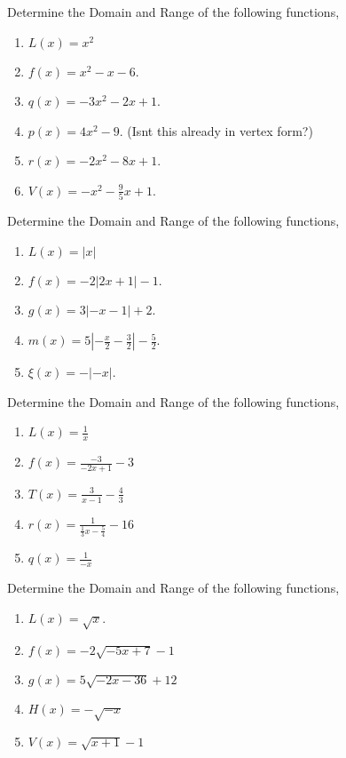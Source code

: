 \documentclass[12pt]{article} %
\begin{document}
\begin{qstn}
  Determine the Domain and Range of the following functions,
  \begin{enumerate}[label=(\alph*)]
    \item $L(x) = x^2$
    \item $f(x) = x^2 - x - 6$.
    \item $q(x) = -3x^2 - 2x + 1$.
    \item $p(x) = 4x^2 - 9$. (Isnt this already in vertex form?)
    \item $r(x) = -2x^2 - 8x + 1$.
    \item $V(x) = -x^2 - \frac{9}{5}x + 1$.
  \end{enumerate}
\end{qstn}

\begin{qstn}
  Determine the Domain and Range of the following functions,
  \begin{enumerate}[label=(\alph*)]
    \item $L(x) = \left|x\right|$
    \item $f(x) = -2| 2x + 1| - 1$.
    \item $g(x) = 3|-x - 1| + 2$.
    \item $m(x) = 5|-\frac{x}{2} - \frac{3}{2}| - \frac{5}{2}$.
    \item $\xi(x) = -|-x|$.
  \end{enumerate}
\end{qstn}

\begin{qstn}
  Determine the Domain and Range of the following functions,
  \begin{enumerate}[label=(\alph*)]
    \item $L(x) = \frac{1}{x}$
    \item $f(x) = \frac{-3}{-2x + 1} - 3$ 
    \item $T(x) = \frac{3}{x - 1} - \frac{4}{3}$
    \item $r(x) = \frac{1}{\frac{1}{3}x - \frac{5}{4}} - 16$
    \item $q(x) = \frac{1}{-x}$
  \end{enumerate}
\end{qstn}

\newpage

\begin{qstn}
  Determine the Domain and Range of the following functions,
  \begin{enumerate}[label=(\alph*)]
    \item $L(x) = \sqrt{x} $.
    \item $f(x) = -2\sqrt{-5x + 7} - 1 $
    \item $g(x) = 5\sqrt{-2x-36} + 12$
    \item $H(x) = -\sqrt{-x}$
    \item $V(x) = \sqrt{x + 1} - 1$
  \end{enumerate}
\end{qstn}
\end{document}

